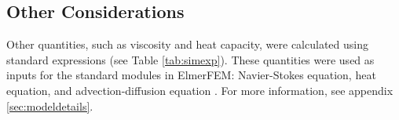 \subsection{\label{sec:modelother} Other Considerations}
Other quantities, such as viscosity and heat capacity, were calculated using standard expressions (see Table \ref{tab:simexp}). These quantities were used as inputs for the standard modules in ElmerFEM: Navier-Stokes equation, heat equation, and advection-diffusion equation \cite{Raback2015}. For more information, see appendix \ref{sec:modeldetails}.